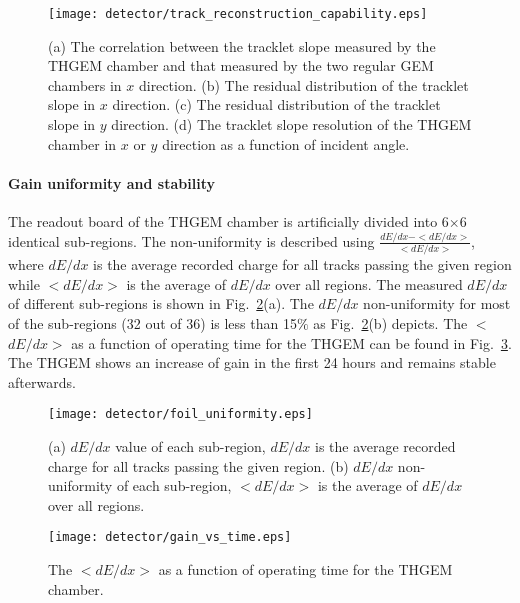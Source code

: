 \begin{figure}[htbp]
\begin{center}
\texttt{[image: detector/track\_reconstruction\_capability.eps]}
\vspace*{-3mm}
\caption{(a) The correlation between the tracklet slope measured by the THGEM chamber and that measured by the two regular GEM chambers in $x$ direction. (b) The residual distribution of the tracklet slope in $x$ direction. (c) The residual distribution of  the tracklet slope in $y$ direction. (d) The tracklet slope resolution of the THGEM chamber in $x$ or $y$ direction as a function of incident angle.} \label{track_reconstruction}
\end{center}
\end{figure}

\paragraph{Gain uniformity and stability} 
The readout board of the THGEM chamber is artificially divided into 6$\times$6 identical sub-regions. The non-uniformity is described using $\frac{dE/dx-<dE/dx>}{<dE/dx>}$, where $dE/dx$ is the average recorded charge for all tracks passing the given region while $<$$dE/dx$$>$ is the average of  $dE/dx$ over all regions. The measured $dE/dx$ of different sub-regions is shown in Fig.~\ref{foil_uniformity}(a). The $dE/dx$ non-uniformity for most of the sub-regions (32 out of 36) is less than 15$\%$ as Fig.~\ref{foil_uniformity}(b) depicts. The $<$$dE/dx$$>$ as a function of operating time for the THGEM can be found in Fig.~\ref{stability}. The THGEM shows an increase of gain in the first 24 hours and remains stable afterwards.

\begin{figure}[htbp]
\begin{center}
\texttt{[image: detector/foil\_uniformity.eps]}
\vspace*{-3mm}
\caption{(a) $dE/dx$ value of each sub-region, $dE/dx$ is the average recorded charge for all tracks passing the given region. (b) $dE/dx$ non-uniformity of each sub-region, $<$$dE/dx$$>$ is the average of $dE/dx$ over all regions.} \label{foil_uniformity}
\end{center}
\end{figure}

\begin{figure}[htbp]
\begin{center}
\texttt{[image: detector/gain\_vs\_time.eps]}
\vspace*{-3mm}
\caption{The $<$$dE/dx$$>$ as a function of  operating time for the THGEM chamber.} \label{stability}
\end{center}
\end{figure}

